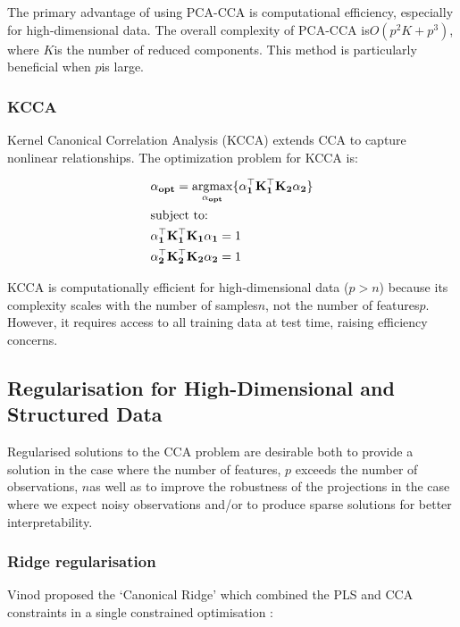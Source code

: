 The primary advantage of using PCA-CCA is computational efficiency, especially for high-dimensional data.
The overall complexity of PCA-CCA is\(O(p^2K + p^3)\), where \( K \)is the number of reduced components.
This method is particularly beneficial when \( p \)is large.

\subsubsection{KCCA}

Kernel Canonical Correlation Analysis (KCCA) extends CCA to capture nonlinear relationships. The optimization problem for KCCA is:

\begin{align}
    & \bold{\alpha_{opt}}=\underset{\bold{\alpha_{opt}}}{\mathrm{argmax}}\{ \bold{\alpha_1^{\top}K_1^{\top}K_2\alpha_2}  \}\\
    & \text{subject to:} \notag\\
    & \bold{\alpha_1^{\top}K_1^{\top}K_1\alpha_1}=1 \notag\\
    & \bold{\alpha_2^{\top}K_2^{\top}K_2\alpha_2}=1 \notag
\end{align}

KCCA is computationally efficient for high-dimensional data (\(p>n\)) because its complexity scales with the number of samples\(n\), not the number of features\(p\).
However, it requires access to all training data at test time, raising efficiency concerns.

\subsection{Regularisation for High-Dimensional and Structured Data}

Regularised solutions to the CCA problem are desirable both to provide a solution in the case where the number of features, \( p \) exceeds the number of observations, \( n \)as well as to improve the robustness of the projections in the case where we expect noisy observations \cite{branco2005robust} and/or to produce sparse solutions for better interpretability\cite{parkhomenko2009sparse}.

\subsubsection{Ridge regularisation}\label{subsec:ridge-regularisation}

Vinod proposed the `Canonical Ridge' which combined the PLS and CCA constraints in a single constrained optimisation \cite{vinod1976canonical}:

